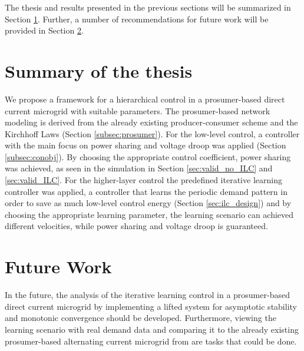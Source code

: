 The thesis and results presented in the previous sections will be summarized in Section \ref{sec:summary}. Further, a number of recommendations for future work will be provided in Section \ref{sec:future}.

\section{Summary of the thesis}
\label{sec:summary}
We propose a framework for a hierarchical control in a prosumer-based direct current microgrid with suitable parameters.
The prosumer-based network modeling is derived from the already existing producer-consumer scheme and the Kirchhoff Laws (Section \ref{subsec:prosumer}). For the low-level control, a controller with the main focus on power sharing and voltage droop was applied (Section \ref{subsec:conobj}). By choosing the appropriate control coefficient, power sharing was achieved, as seen in the simulation in Section \ref{sec:valid_no_ILC} and \ref{sec:valid_ILC}. 
For the higher-layer control the predefined iterative learning controller was applied, a controller that learns the periodic demand pattern in order to save as much low-level control energy (Section \ref{sec:ilc_design}) and by choosing the appropriate learning parameter, the learning scenario can achieved different velocities, while power sharing and voltage droop is guaranteed.

\section{Future Work}
\label{sec:future}
In the future, the analysis of the iterative learning control in a prosumer-based direct current microgrid by implementing a lifted system for asymptotic stability and monotonic convergence should be developed. Furthermore,  viewing the learning scenario with real demand data and comparing it to the already existing prosumer-based alternating current microgrid from \cite{paperilc} are tasks that could be done. 